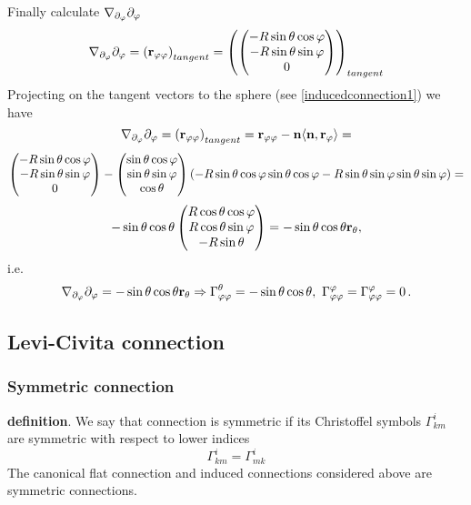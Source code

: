 \documentclass[12pt]{article}
\theoremstyle{theorem}
\numberwithin{equation}{section}
\begin{document}
Finally calculate $\nabla_{\partial_\varphi} \partial_\varphi$
                $$
            \nabla_{\partial_\varphi} \partial_\varphi=\left({\bf r}_{\varphi\varphi}\right)_{tangent}=
            \left(
            \begin{pmatrix}
            -R\sin\theta\cos\varphi\cr
            -R\sin\theta\sin\varphi\cr
            0\cr
                  \end{pmatrix}
                  \right)_{tangent}
                $$
Projecting on the tangent vectors to the sphere (see \eqref{inducedconnection1}) we have
     $$
\nabla_{\partial_\varphi} \partial_\varphi=\left({\bf r}_{\varphi\varphi}\right)_{tangent}=
{\bf r}_{\varphi\varphi}-{\bf n}\langle{\bf n},{\bf r}_{\varphi}\rangle=
         $$
         $$
     \begin{pmatrix}
            -R\sin\theta\cos\varphi\cr
            -R\sin\theta\sin\varphi\cr
            0\cr
                  \end{pmatrix}-
                  \begin{pmatrix}
            \sin\theta\cos\varphi\cr
            \sin\theta\sin\varphi\cr
            \cos\theta\cr
                  \end{pmatrix}\left(-R\sin\theta\cos\varphi\sin\theta\cos\varphi-
                  R\sin\theta\sin\varphi\sin\theta\sin\varphi\right)=
     $$
         $$
      -\sin\theta\cos\theta
      \begin{pmatrix}
            R\cos\theta\cos\varphi\cr
            R\cos\theta\sin\varphi\cr
            -R\sin\theta\cr
                  \end{pmatrix}=-\sin\theta\cos\theta{\bf r}_\theta,
         $$
i.e.
\begin{equation}\label{connectiononsphere12}
   \nabla_{\partial_\varphi}\partial_\varphi=-\sin\theta\cos\theta{\bf r}_\theta \Rightarrow
    \Gamma^\theta_{\varphi\varphi}=-\sin\theta\cos\theta,\,\,
    \Gamma^\varphi_{\varphi\varphi}=\Gamma^\varphi_{\varphi\varphi}=0\,.
\end{equation}



\subsection {Levi-Civita connection}


  \subsubsection {Symmetric connection}

 {\bf definition}. We say that connection is symmetric if its Christoffel symbols $\Gamma^i_{km}$ are symmetric with respect to
  lower indices
  \begin{equation}\label{symmetricconnection}
    \Gamma^i_{km}=\Gamma^i_{mk}
  \end{equation}
  The canonical flat connection and induced connections considered above are symmetric connections.
\end{document}
